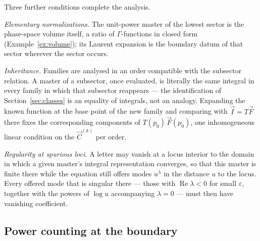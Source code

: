 \documentclass[11pt]{article}
\newcommand{\eps}{\varepsilon}
\begin{document}
Three further conditions complete the analysis.

\emph{Elementary normalizations.}  The unit-power master of the
lowest sector is the phase-space volume itself, a ratio of
$\Gamma$-functions in closed form (Example~\ref{ex:volume}); its
Laurent expansion is the boundary datum of that sector wherever the
sector occurs.

\emph{Inheritance.}  Families are analysed in an order compatible
with the subsector relation.  A master of a subsector, once
evaluated, is literally the same integral in every family in which
that subsector reappears --- the identification of
Section~\ref{sec:classes} is an equality of integrals, not an
analogy.  Expanding the known function at the base point of the new
family and comparing with $\vec I = T\vec F$ there fixes the
corresponding components of $T(p_0)\,\vec F(p_0)$, one inhomogeneous
linear condition on the $\vec C^{(k)}$ per order.

\emph{Regularity at spurious loci.}  A letter may vanish at a locus
interior to the domain in which a given master's integral
representation converges, so that this master is finite there while
the equation still offers modes $u^{\lambda}$ in the distance $u$ to
the locus.  Every offered mode that is singular there --- those with
$\operatorname{Re}\lambda < 0$ for small $\eps$, together with the
powers of $\log u$ accompanying $\lambda = 0$ --- must then have
vanishing coefficient.

\subsection{Power counting at the boundary}
\label{sec:powercounting}
\end{document}

